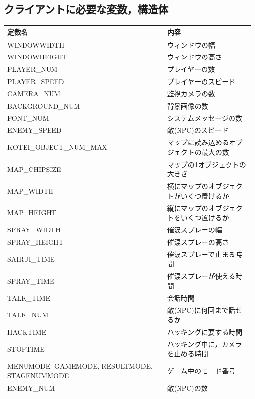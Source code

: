 \documentclass{jarticle}
\begin{document}
\subsection{クライアントに必要な変数，構造体}
\begin{table}[H]
\begin{tabular}{|p{20em}|p{20em}|}
\hline
    定数名  & 内容\\ \hline
    WINDOWWIDTH & ウィンドウの幅 \\ 
    WINDOWHEIGHT & ウィンドウの高さ \\
    PLAYER\_NUM & プレイヤーの数 \\
    PLAYER\_SPEED & プレイヤーのスピード \\
    CAMERA\_NUM & 監視カメラの数 \\
    BACKGROUND\_NUM & 背景画像の数 \\
    FONT\_NUM & システムメッセージの数 \\
    ENEMY\_SPEED & 敵(NPC)のスピード \\
    KOTEI\_OBJECT\_NUM\_MAX & マップに読み込めるオブジェクトの最大の数 \\
    MAP\_CHIPSIZE & マップの1オブジェクトの大きさ \\
    MAP\_WIDTH & 横にマップのオブジェクトがいくつ置けるか \\
    MAP\_HEIGHT & 縦にマップのオブジェクトをいくつ置けるか　\\
    SPRAY\_WIDTH & 催涙スプレーの幅 \\
    SPRAY\_HEIGHT & 催涙スプレーの高さ \\
    SAIRUI\_TIME & 催涙スプレーで止まる時間 \\
    SPRAY\_TIME & 催涙スプレーが使える時間 \\
    TALK\_TIME & 会話時間 \\
    TALK\_NUM & 敵(NPC)に何回まで話せるか \\
    HACKTIME & ハッキングに要する時間 \\
    STOPTIME & ハッキング中に，カメラを止める時間 \\
    MENUMODE, GAMEMODE, RESULTMODE, STAGENUMMODE & ゲーム中のモード番号 \\
    ENEMY\_NUM & 敵(NPC)の数\\ \hline
\end{tabular}
\end{table}
\end{document}
